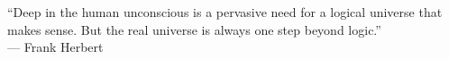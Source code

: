 \begin{titlepage}
\thispagestyle{empty}
\setlength{\parindent}{0cm}
\LARGE

\vspace*{-1\topskip plus 1fill}
\vbox{``Deep in the human unconscious is a pervasive need for a logical universe that makes sense. But the real universe is always one step beyond logic.''\\
\hspace*{\fill}--- Frank Herbert}
\vspace*{\fill}
\end{titlepage}